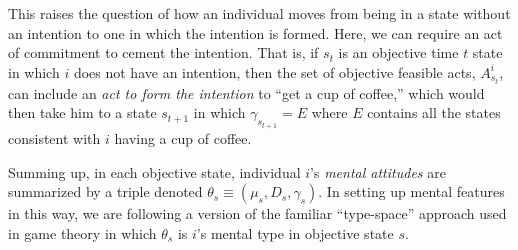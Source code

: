 \documentclass[
11pt,
titlepage,
reqno,
]{article}%
\theoremstyle{definition}
\begin{document}
This raises the question of how an individual moves from being in a state without an intention to one in which the intention is formed. 
Here, we can require an act of commitment to cement the intention. 
That is, if $s_t$ is an objective time $t$ state in which $i$ does not have an intention, then the set of objective feasible acts, $A^i_{s_t}$, can include an \textit{act to form the intention} to ``get a cup of coffee,'' which would then take him to a state $s_{t+1}$ in which $\gamma_{s_{t+1}}=E$ where $E$ contains all the states consistent with $i$ having a cup of coffee.
	
Summing up, in each objective state, individual $i$'s \textit{mental attitudes} are summarized by a triple denoted $\theta_s\equiv(\mu_s,D_s,\gamma_s)$.
In setting up mental features in this way, we are following a version of the familiar ``type-space'' approach used in game theory \citep[See][]{Harsanyi1967, Mertens1985a} in which $\theta_s$ is $i$'s mental type in objective state $s$. 
	
	
	




\pagebreak
\end{document}
